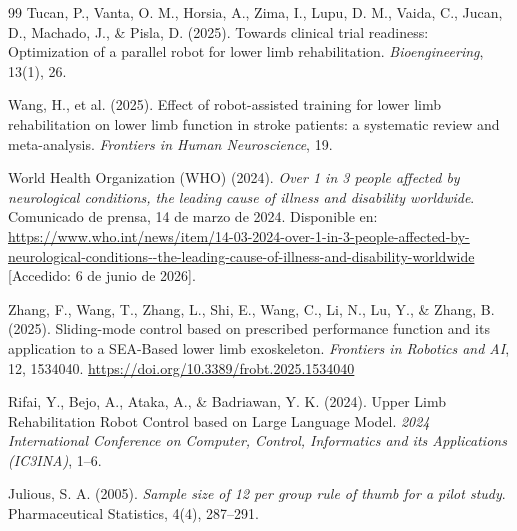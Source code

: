\documentclass[a4paper,12pt]{article}
\begin{document}
\begin{thebibliography}{99}
    Tucan, P., Vanta, O. M., Horsia, A., Zima, I., Lupu, D. M., Vaida, C., Jucan, D., Machado, J., \& Pisla, D. (2025).
    \newblock Towards clinical trial readiness: Optimization of a parallel robot for lower limb rehabilitation.
    \newblock \emph{Bioengineering}, 13(1), 26.

    Wang, H., et al. (2025).
    \newblock Effect of robot-assisted training for lower limb rehabilitation on lower limb function in stroke patients: a systematic review and meta-analysis.
    \newblock \emph{Frontiers in Human Neuroscience}, 19.

    World Health Organization (WHO) (2024).
    \newblock \emph{Over 1 in 3 people affected by neurological conditions, the leading cause of illness and disability worldwide}.
    \newblock Comunicado de prensa, 14 de marzo de 2024.
    \newblock Disponible en: \url{https://www.who.int/news/item/14-03-2024-over-1-in-3-people-affected-by-neurological-conditions--the-leading-cause-of-illness-and-disability-worldwide} [Accedido: 6 de junio de 2026].

    Zhang, F., Wang, T., Zhang, L., Shi, E., Wang, C., Li, N., Lu, Y., \& Zhang, B. (2025).
    \newblock Sliding-mode control based on prescribed performance function and its application to a SEA-Based lower limb exoskeleton.
    \newblock \emph{Frontiers in Robotics and AI}, 12, 1534040.
    \newblock \url{https://doi.org/10.3389/frobt.2025.1534040}

    Rifai, Y., Bejo, A., Ataka, A., \& Badriawan, Y. K. (2024).
    \newblock Upper Limb Rehabilitation Robot Control based on Large Language Model.
    \newblock \emph{2024 International Conference on Computer, Control, Informatics and its Applications (IC3INA)}, 1--6.

    Julious, S. A. (2005). \textit{Sample size of 12 per group rule of thumb for a pilot study}. Pharmaceutical Statistics, 4(4), 287--291.


\end{thebibliography}
\end{document}
